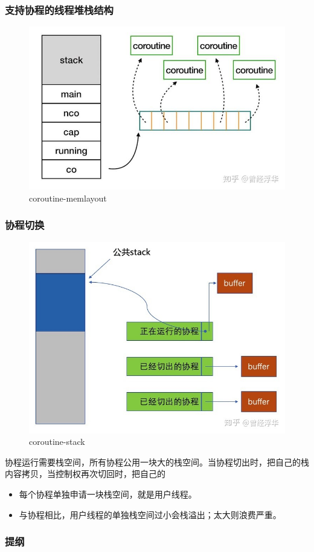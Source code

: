 \begin{frame}[fragile]
    \frametitle{支持协程的线程堆栈结构}
% 
	\begin{figure}
		\centering
		\includegraphics[width=0.65\linewidth]{figs/coroutine-memlayout.jpg}
    \caption{coroutine-memlayout}
  \end{figure}



% 

\end{frame}
\begin{frame}[fragile]
    \frametitle{协程切换}
% 
	\begin{figure}
		\centering
		\includegraphics[width=0.35\linewidth]{figs/coroutine-stack.jpg}
    \caption{coroutine-stack}
  \end{figure}



% 
协程运行需要栈空间，所有协程公用一块大的栈空间。当协程切出时，把自己的栈内容拷贝，当控制权再次切回时，把自己的%

    \begin{itemize}
        \item 每个协程单独申请一块栈空间，就是用户线程。
        \item 与协程相比，用户线程的单独栈空间过小会栈溢出；太大则浪费严重。 
    \end{itemize}
\end{frame}
% 
\begin{frame}
\frametitle{提纲} %
\tableofcontents %
\end{frame}
